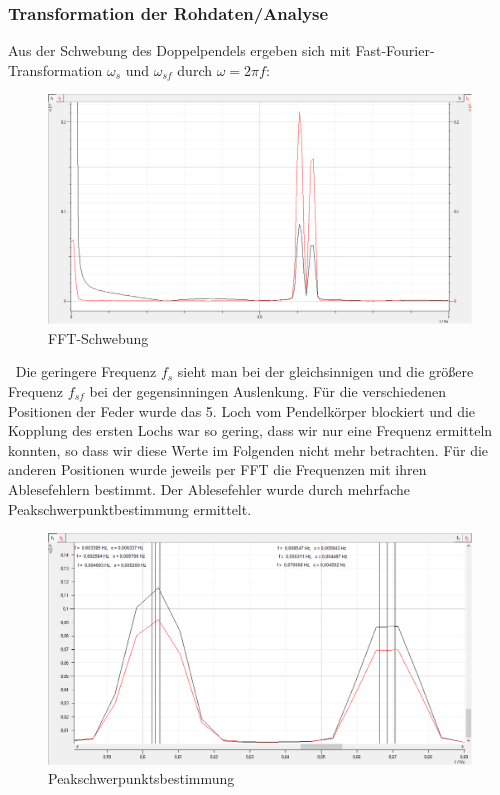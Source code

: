 \documentclass[12pt,a4paper]{article}
\begin{document}
\subsubsection{Transformation der Rohdaten/Analyse}
Aus der Schwebung des Doppelpendels ergeben sich mit Fast-Fourier-Transformation $\omega_s$ und $\omega_{sf}$ durch $\omega=2\pi f$:
\begin{figure}[H]
\centering
\includegraphics[scale=0.6]{Bilder/FFT-Schwebung.png}
\caption{FFT-Schwebung}
\end{figure}
$~$ \newline
Die geringere Frequenz $f_s$ sieht man bei der gleichsinnigen und die größere Frequenz $f_{sf}$ bei der gegensinningen Auslenkung.
\newline
Für die verschiedenen Positionen der Feder wurde das 5. Loch vom Pendelkörper blockiert und die Kopplung des ersten Lochs war so gering, dass wir nur eine Frequenz ermitteln konnten, so dass wir diese Werte im Folgenden nicht mehr betrachten.
Für die anderen Positionen wurde jeweils per FFT die Frequenzen mit ihren Ablesefehlern bestimmt. Der Ablesefehler wurde durch mehrfache Peakschwerpunktbestimmung ermittelt.
\begin{figure}[H]
\centering
\includegraphics[scale=0.42]{Bilder/fft_Fehlermessung.png}
\caption{Peakschwerpunktsbestimmung}
\end{figure}
\end{document}
